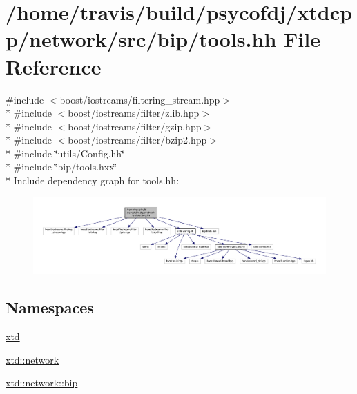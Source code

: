 \hypertarget{tools_8hh}{\section{/home/travis/build/psycofdj/xtdcpp/network/src/bip/tools.hh File Reference}
\label{tools_8hh}
}
{\ttfamily \#include $<$boost/iostreams/filtering\-\_\-stream.\-hpp$>$}\\*
{\ttfamily \#include $<$boost/iostreams/filter/zlib.\-hpp$>$}\\*
{\ttfamily \#include $<$boost/iostreams/filter/gzip.\-hpp$>$}\\*
{\ttfamily \#include $<$boost/iostreams/filter/bzip2.\-hpp$>$}\\*
{\ttfamily \#include \char`\"{}utils/\-Config.\-hh\char`\"{}}\\*
{\ttfamily \#include \char`\"{}bip/tools.\-hxx\char`\"{}}\\*
Include dependency graph for tools.\-hh\-:
\nopagebreak
\begin{figure}[H]
\begin{center}
\leavevmode
\includegraphics[width=350pt]{tools_8hh__incl}
\end{center}
\end{figure}
\subsection*{Namespaces}
\begin{DoxyCompactItemize}
\item 
\hyperlink{namespacextd}{xtd}
\item 
\hyperlink{namespacextd_1_1network}{xtd\-::network}
\item 
\hyperlink{namespacextd_1_1network_1_1bip}{xtd\-::network\-::bip}
\end{DoxyCompactItemize}
